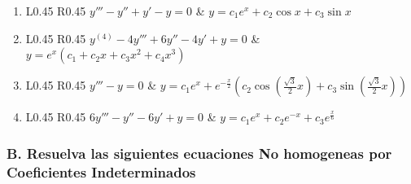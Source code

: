 \documentclass[a4paper,12pt]{article}
\begin{document}
\begin{enumerate}
    \item
    \begin{tabularx}{\linewidth}{L{0.45\linewidth} R{0.45\linewidth}}
    \( y''' - y'' + y' - y = 0 \) & \(\displaystyle y = c_1 e^x + c_2 \cos x + c_3 \sin x \)
    \end{tabularx}
    
    \item
    \begin{tabularx}{\linewidth}{L{0.45\linewidth} R{0.45\linewidth}}
    \( y^{(4)} - 4 y''' + 6 y'' - 4 y' + y = 0 \) & \(\displaystyle y = e^x (c_1 + c_2 x + c_3 x^2 + c_4 x^3) \)
    \end{tabularx}
    
    \item
    \begin{tabularx}{\linewidth}{L{0.45\linewidth} R{0.45\linewidth}}
    \( y''' - y = 0 \) & \(\displaystyle y = c_1 e^x + e^{-\frac{x}{2}} \left( c_2 \cos\left(\frac{\sqrt{3}}{2} x\right) + c_3 \sin\left(\frac{\sqrt{3}}{2} x\right) \right) \)
    \end{tabularx}

    \item
    \begin{tabularx}{\linewidth}{L{0.45\linewidth} R{0.45\linewidth}}
    \( 6 y''' - y'' - 6 y' + y = 0 \) & \(\displaystyle y = c_1 e^x + c_2 e^{-x} + c_3 e^{\frac{x}{6}} \)
    \end{tabularx}
    
\end{enumerate}

\subsubsection*{B. Resuelva las siguientes ecuaciones No homogeneas por Coeficientes Indeterminados}
\end{document}
